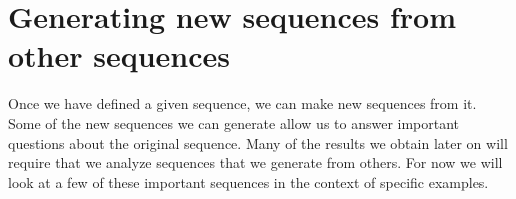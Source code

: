 \documentclass{ximera}
\begin{document}
%  
%  

\section{Generating new sequences from other sequences}

Once we have defined a given sequence, we can make new sequences from it.  Some of the new sequences we can generate allow us to answer important questions about the original sequence.  Many of the results we obtain later on will require that we analyze sequences that we generate from others.  For now we will look at a few of these important sequences in the context of specific examples. 
\end{document}
